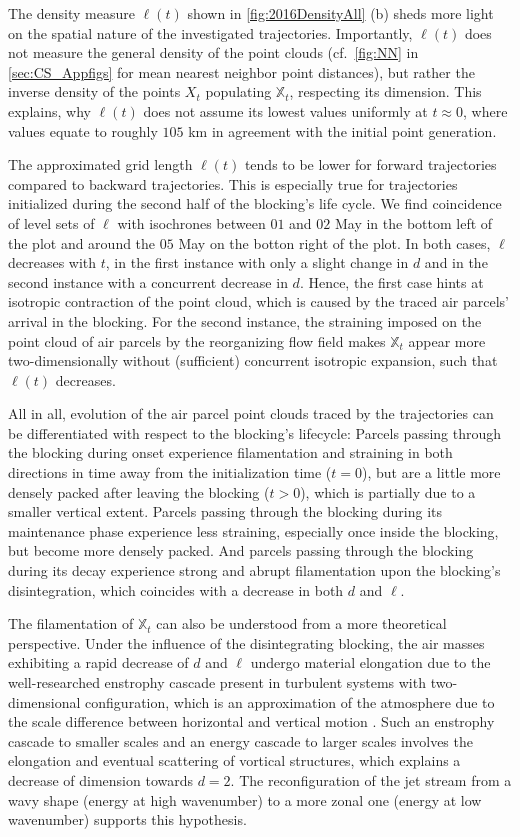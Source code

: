 The density measure $\ell(t)$ shown in \cref{fig:2016DensityAll} (b) sheds more light on the spatial nature of the investigated trajectories. Importantly, $\ell(t)$ does not measure the general density of the point clouds (cf.~\cref{fig:NN} in \cref{sec:CS_Appfigs} for mean nearest neighbor point distances), but rather the inverse density of the points $X_t$ populating $\mathbb{X}_t$, respecting its dimension. This explains, why $\ell(t)$ does not assume its lowest values uniformly at $t \approx 0$, where values equate to roughly $105$ km in agreement with the initial point generation.

The approximated grid length $\ell(t)$ tends to be lower for forward trajectories compared to backward trajectories. This is especially true for trajectories initialized during the second half of the blocking's life cycle. We find coincidence of level sets of $\ell$ with isochrones between $01$ and $02$ May in the bottom left of the plot and around the $05$ May on the botton right of the plot. In both cases, $\ell$ decreases with $t$, in the first instance with only a slight change in $d$ and in the second instance with a concurrent decrease in $d$. Hence, the first case hints at isotropic contraction of the point cloud, which is caused by the traced air parcels' arrival in the blocking. For the second instance, the straining imposed on the point cloud of air parcels by the reorganizing flow field makes $\mathbb{X}_t$ appear more two-dimensionally without (sufficient) concurrent isotropic expansion, such that $\ell(t)$ decreases.

All in all, evolution of the air parcel point clouds traced by the trajectories can be differentiated with respect to the blocking's lifecycle: Parcels passing through the blocking during onset experience filamentation and straining in both directions in time away from the initialization time ($t=0$), but are a little more densely packed after leaving the blocking ($t > 0$), which is partially due to a smaller vertical extent. Parcels passing through the blocking during its maintenance phase experience less straining, especially once inside the blocking, but become more densely packed. And parcels passing through the blocking during its decay experience strong and abrupt filamentation upon the blocking's disintegration, which coincides with a decrease in both $d$ and $\ell$.

The filamentation of $\mathbb{X}_t$ can also be understood from a more theoretical perspective. Under the influence of the disintegrating blocking, the air masses exhibiting a rapid decrease of $d$ and $\ell$ undergo material elongation due to the well-researched enstrophy cascade present in turbulent systems with two-dimensional configuration, which is an approximation of the atmosphere due to the scale difference between horizontal and vertical motion \parencite{ditlevsenTurbulenceShellModels2010, boffettaTwoDimensionalTurbulence2012}. Such an enstrophy cascade to smaller scales and an energy cascade to larger scales involves the elongation and eventual scattering of vortical structures, which explains a decrease of dimension towards $d=2$. The reconfiguration of the jet stream from a wavy shape (energy at high wavenumber) to a more zonal one (energy at low wavenumber) supports this hypothesis.


